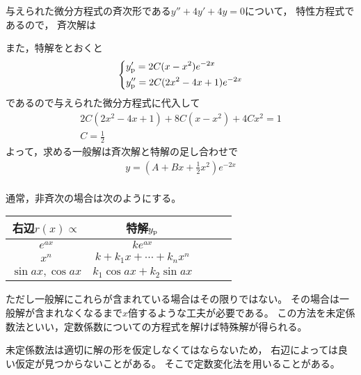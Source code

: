 \begin{ans*}
  与えられた微分方程式の斉次形である$y'' + 4y' + 4y = 0$について，
  特性方程式\mbox{}であるので，
  斉次解は

  また，特解をとおくと
  \begin{gather}
    \begin{dcases*}
      y'_{\rm{p}} = 2C(x-x^2)e^{-2x} \\
      y''_{\rm{p}}= 2C(2x^2-4x+1)e^{-2x}
    \end{dcases*}
  \end{gather}
  であるので与えられた微分方程式に代入して
  \begin{gather}
    2C(2x^2 - 4x + 1) + 8C(x-x^2) + 4Cx^2 = 1 \\
    C = \frac{1}{2} 
  \end{gather}
  よって，求める一般解は斉次解と特解の足し合わせで
  \begin{gather}
    y = \left(A + Bx + \frac{1}{2}x^2\right)e^{-2x} \\
  \end{gather}
\end{ans*}
\begin{supple*}
  通常，非斉次の場合は次のようにする。
  
  \begin{table}[H]
  \centering
  \begin{tabular}{ccccc}
  \toprule
    右辺$r(x)\propto$ & 特解$y_{\rm{p}}$ \\
  \midrule
    $e^{ax}$ & $k e^{ax}$ \\
    $x^n$ & $k + k_1 x + \cdots + k_n x^n$ \\
    $\sin{ax},\cos{ax}$ & $k_1 \cos{ax} + k_2 \sin{ax}$ \\
  \bottomrule
  \end{tabular}\end{table}

  ただし一般解にこれらが含まれている場合はその限りではない。
  その場合は一般解が含まれなくなるまで$x$倍するような工夫が必要である。
  この方法を未定係数法といい，定数係数についての方程式を解けば特殊解が得られる。

  未定係数法は適切に解の形を仮定しなくてはならないため，
  右辺によっては良い仮定が見つからないことがある。
  そこで定数変化法を用いることがある。
\end{supple*}





